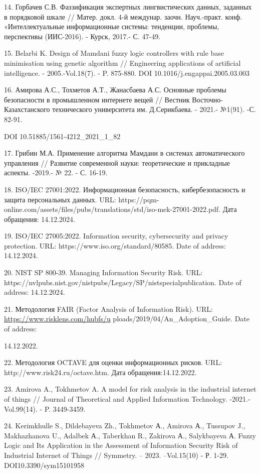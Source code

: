 14. Горбачев С.В. Фаззификация экспертных лингвистических данных,
заданных в порядковой шкале // Матер. докл. 4-й междунар. заочн.
Науч.-практ. конф. «Интеллектуальные информационные системы: тенденции,
проблемы, перспективы (ИИС-2016). - Курск, 2017.- С. 47-49.

15. Belarbi K. Design of Mamdani fuzzy logic controllers with rule base
minimisation using genetic algorithm // Engineering applications of
artificial intelligence. - 2005.-Vol.18(7). - P. 875-880. DOI
10.1016/j.engappai.2005.03.003

16. Амирова А.С., Тохметов А.Т., Жанасбаева А.С. Основные проблемы
безопасности в промышленном интернете вещей // Вестник
Восточно-Казахстанского технического университета им. Д.Серикбаева. -
2021.- №1(91). -С. 82-91.

DOI 10.51885/1561-4212\_2021\_1\_82

17. Грибин М.А. Применение алгоритма Мамдани в системах автоматического
управления // Развитие современной науки: теоретические и прикладные
аспекты. -2019.- № 22. - С. 16-19.

18. ISO/IEC 27001:2022. Информационная безопасность, кибербезопасность и
защита персональных данных. URL:
https://pqm-online.com/assets/files/pubs/translations/std/iso-mek-27001-2022.pdf.
Дата обращения: 14.12.2024.

19. ISO/IEC 27005:2022. Information security, cybersecurity and privacy
protection. URL: https://www.iso.org/standard/80585. Date of address:
14.12.2024.

20. NIST SP 800-39. Managing Information Security Risk. URL:
https://nvlpubs.nist.gov/nistpubs/Legacy/SP/nistspecialpublication. Date
of address: 14.12.2024.

21. Методология FAIR (Factor Analysis of Information Risk). URL:
\url{https://www.risklens.com/hubfs/u}
ploads/2019/04/An\_Adoption\_Guide. Date of address:

14.12.2022.

22. Методология OCTAVE для оценки информационных рисков. URL:
http://www.risk24.ru/octave.htm. Дата обращения:14.12.2022.

23. Amirova A., Tokhmetov A. A model for risk analysis in the industrial
internet of things // Journal of Theoretical and Applied Information
Technology. -2021.- Vol.99(14). - P. 3449-3459.

24. Kerimkhulle S., Dildebayeva Zh., Tokhmetov А., Amirova А., Tussupov
J., Makhazhanova U., Adalbek А., Taberkhan R., Zakirova А., Salykbayeva
А. Fuzzy Logic and Its Application in the Assessment of Information
Security Risk of Industrial Internet of Things // Symmetry. -- 2023.
--Vol.15(10) - Р. 1-29. DOI10.3390/sym15101958

